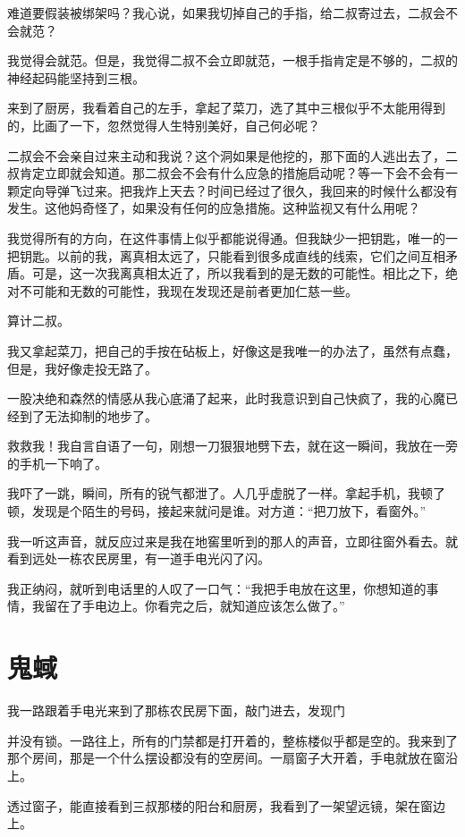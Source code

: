 难道要假装被绑架吗？我心说，如果我切掉自己的手指，给二叔寄过去，二叔会不会就范？

我觉得会就范。但是，我觉得二叔不会立即就范，一根手指肯定是不够的，二叔的神经起码能坚持到三根。

来到了厨房，我看着自己的左手，拿起了菜刀，选了其中三根似乎不太能用得到的，比画了一下，忽然觉得人生特别美好，自己何必呢？

二叔会不会亲自过来主动和我说？这个洞如果是他挖的，那下面的人逃出去了，二叔肯定立即就会知道。那二叔会不会有什么应急的措施启动呢？等一下会不会有一颗定向导弹飞过来。把我炸上天去？时间已经过了很久，我回来的时候什么都没有发生。这他妈奇怪了，如果没有任何的应急措施。这种监视又有什么用呢？

我觉得所有的方向，在这件事情上似乎都能说得通。但我缺少一把钥匙，唯一的一把钥匙。以前的我，离真相太远了，只能看到很多成直线的线索，它们之间互相矛盾。可是，这一次我离真相太近了，所以我看到的是无数的可能性。相比之下，绝对不可能和无数的可能性，我现在发现还是前者更加仁慈一些。

算计二叔。

我又拿起菜刀，把自己的手按在砧板上，好像这是我唯一的办法了，虽然有点蠢，但是，我好像走投无路了。

一股决绝和森然的情感从我心底涌了起来，此时我意识到自己快疯了，我的心魔已经到了无法抑制的地步了。

救救我！我自言自语了一句，刚想一刀狠狠地劈下去，就在这一瞬间，我放在一旁的手机一下响了。

我吓了一跳，瞬间，所有的锐气都泄了。人几乎虚脱了一样。拿起手机，我顿了顿，发现是个陌生的号码，接起来就问是谁。对方道：“把刀放下，看窗外。”

我一听这声音，就反应过来是我在地窖里听到的那人的声音，立即往窗外看去。就看到远处一栋农民房里，有一道手电光闪了闪。

我正纳闷，就听到电话里的人叹了一口气：“我把手电放在这里，你想知道的事情，我留在了手电边上。你看完之后，就知道应该怎么做了。”

\chapter{鬼蜮}

我一路跟着手电光来到了那栋农民房下面，敲门进去，发现门

并没有锁。一路往上，所有的门禁都是打开着的，整栋楼似乎都是空的。我来到了那个房间，那是一个什么摆设都没有的空房间。一扇窗子大开着，手电就放在窗沿上。

透过窗子，能直接看到三叔那楼的阳台和厨房，我看到了一架望远镜，架在窗边上。

